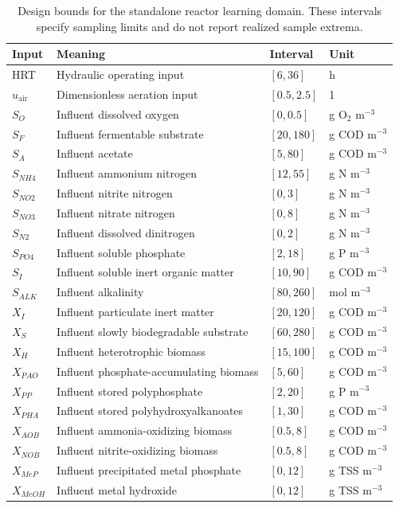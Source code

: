 \begin{table}[htbp]
\centering\small
\caption{Design bounds for the standalone reactor learning domain. These intervals specify sampling limits and do not report realized sample extrema.}\label{tab:reactor_sampling_domain}
\begin{tabular}{lp{5.7cm}ll}
\toprule
Input & Meaning & Interval & Unit\\
\midrule
HRT & Hydraulic operating input & $[6,36]$ & h\\
$u_{\mathrm{air}}$ & Dimensionless aeration input & $[0.5,2.5]$ & 1\\
$S_O$ & Influent dissolved oxygen & $[0,0.5]$ & g O$_2$ m$^{-3}$\\
$S_F$ & Influent fermentable substrate & $[20,180]$ & g COD m$^{-3}$\\
$S_A$ & Influent acetate & $[5,80]$ & g COD m$^{-3}$\\
$S_{NH4}$ & Influent ammonium nitrogen & $[12,55]$ & g N m$^{-3}$\\
$S_{NO2}$ & Influent nitrite nitrogen & $[0,3]$ & g N m$^{-3}$\\
$S_{NO3}$ & Influent nitrate nitrogen & $[0,8]$ & g N m$^{-3}$\\
$S_{N2}$ & Influent dissolved dinitrogen & $[0,2]$ & g N m$^{-3}$\\
$S_{PO4}$ & Influent soluble phosphate & $[2,18]$ & g P m$^{-3}$\\
$S_I$ & Influent soluble inert organic matter & $[10,90]$ & g COD m$^{-3}$\\
$S_{ALK}$ & Influent alkalinity & $[80,260]$ & mol m$^{-3}$\\
$X_I$ & Influent particulate inert matter & $[20,120]$ & g COD m$^{-3}$\\
$X_S$ & Influent slowly biodegradable substrate & $[60,280]$ & g COD m$^{-3}$\\
$X_H$ & Influent heterotrophic biomass & $[15,100]$ & g COD m$^{-3}$\\
$X_{PAO}$ & Influent phosphate-accumulating biomass & $[5,60]$ & g COD m$^{-3}$\\
$X_{PP}$ & Influent stored polyphosphate & $[2,20]$ & g P m$^{-3}$\\
$X_{PHA}$ & Influent stored polyhydroxyalkanoates & $[1,30]$ & g COD m$^{-3}$\\
$X_{AOB}$ & Influent ammonia-oxidizing biomass & $[0.5,8]$ & g COD m$^{-3}$\\
$X_{NOB}$ & Influent nitrite-oxidizing biomass & $[0.5,8]$ & g COD m$^{-3}$\\
$X_{MeP}$ & Influent precipitated metal phosphate & $[0,12]$ & g TSS m$^{-3}$\\
$X_{MeOH}$ & Influent metal hydroxide & $[0,12]$ & g TSS m$^{-3}$\\
\bottomrule
\end{tabular}
\end{table}

